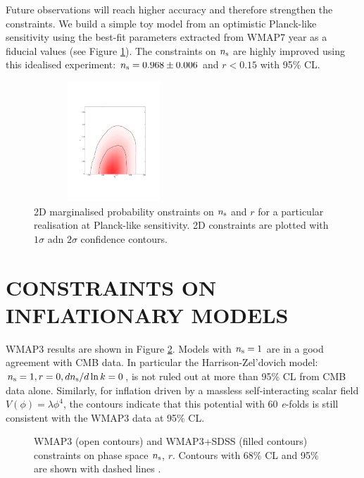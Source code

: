 \documentclass{rmaa}
\begin{document}
 Future observations will reach higher accuracy and therefore strengthen the constraints. 
 We build a simple toy model from an optimistic Planck-like sensitivity \citep{Planck} using 
 the best-fit parameters extracted from WMAP7 year as a fiducial values (see Figure \ref{fig:infla_2}). 
The constraints on $n_{\rm s}$ are highly improved using this idealised experiment: $n_{\rm s}=0.968\pm0.006$
and $r<0.15$ with 95\% CL.

\begin{figure}[h!]
 \begin{center}
 \includegraphics[trim = 1mm 50mm 10mm 40mm, clip, width=6cm, height=4.5cm]{planck.pdf}
\caption{2D marginalised probability onstraints on $n_{\rm s}$ and $r$ for
a particular realisation at Planck-like sensitivity. 2D constraints are plotted with $1\sigma$ adn $2\sigma$
confidence contours.
}\label{fig:infla_2}
\end{center}
\end{figure}	


\section{CONSTRAINTS ON INFLATIONARY MODELS}

WMAP3 results are shown in Figure \ref{fig:Kinney2}. Models with $n_{\rm s}=1$ are in a 
good agreement with CMB data. In particular the Harrison-Zel'dovich model: $n_{\rm s}=1, 
r=0, dn_{\rm s}/d \ln k=0$, is not ruled out at more than 95\% CL from CMB data alone.
Similarly, for inflation driven by a massless self-interacting scalar field
$V(\phi) = \lambda\phi^4$,  the contours indicate that this potential
with 60 \textit{e}-folds is still consistent with the WMAP3 data at 95\% CL. 
\\

\begin{figure}[h!] 
\centerline{ \epsfxsize=220pt  }
\caption{WMAP3 (open contours) and 
WMAP3+SDSS (filled contours) constraints on phase space $n_{\rm s}$, $r$. Contours with 68\% CL 
and 95\% are shown with dashed lines \citep{Kinney}.}
\label{fig:Kinney2}
\end{figure}
\end{document}
